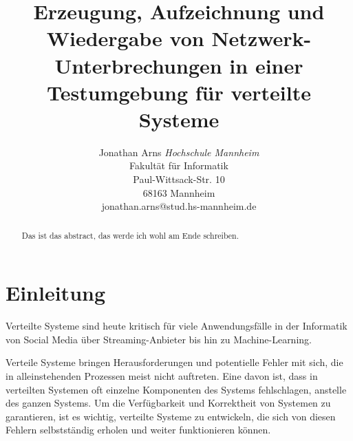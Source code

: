 \documentclass[12pt,a4paper]{report}
\begin{document}
\title{Erzeugung, Aufzeichnung und Wiedergabe von Netzwerk-Unterbrechungen in einer Testumgebung für verteilte Systeme}


\author{Jonathan Arns
	\textit{Hochschule Mannheim} \\
	Fakultät für Informatik\\
	Paul-Wittsack-Str. 10\\
	68163 Mannheim\\
	jonathan.arns@stud.hs-mannheim.de
}

\maketitle

\tableofcontents
\setlength{\parskip}{0.6em}


\begin{abstract}
	Das ist das abstract, das werde ich wohl am Ende schreiben.
\end{abstract}


\chapter{Einleitung}
Verteilte Systeme sind heute kritisch für viele Anwendungsfälle in der Informatik von Social Media über Streaming-Anbieter bis hin
zu Machine-Learning.

Verteile Systeme bringen Herausforderungen und potentielle Fehler mit sich, die in alleinstehenden Prozessen meist nicht
auftreten. Eine davon ist, dass in verteilten Systemen oft einzelne Komponenten des Systems fehlschlagen, anstelle des ganzen
Systems. Um die Verfügbarkeit und Korrektheit von Systemen zu garantieren, ist es wichtig, verteilte Systeme zu entwickeln, die
sich von diesen Fehlern selbstständig erholen und weiter funktionieren können. \cite{distributed_systems_book}
\end{document}
